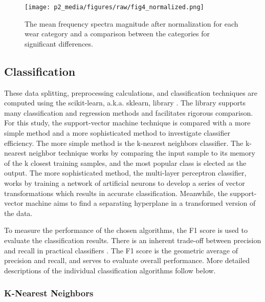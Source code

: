 \begin{figure}[t!]
\centering
\texttt{[image: p2\_media/figures/raw/fig4\_normalized.png]}
\caption{
The mean frequency spectra magnitude after normalization for each wear category and a 
comparison between the categories for significant differences.
}
\label{fig:sigs}
\end{figure}

\subsection{Classification}

These data splitting, preprocessing calculations, and classification techniques are 
computed using the scikit-learn, a.k.a. sklearn, library \cite{JMLR:v12:pedregosa11a}.
The library supports many classification and regression methods and facilitates rigorous comparison.
For this study, the support-vector machine technique is compared with a more simple method 
and a more sophisticated method to investigate classifier efficiency. 
The more simple method is the k-nearest neighbors classifier. 
The k-nearest neighbor technique works by comparing the input 
sample to its memory of the k closest training samples, and the most popular 
class is elected as the output. The more sophisticated method, 
the multi-layer perceptron classifier, works by training a network of artificial 
neurons to develop a series of vector transformations which results in accurate classification. 
Meanwhile, the support-vector machine aims to find a separating hyperplane in a transformed version of the data.

To measure the performance of the chosen algorithms, the F1 score is 
used to evaluate the classification results. 
There is an inherent trade-off between precision and recall in practical classifiers \cite{buckland94}.
The F1 score is the geometric average of
precision and recall, and serves to evaluate overall performance. 
More detailed descriptions of the individual classification algorithms follow below.

\subsubsection{K-Nearest Neighbors}

